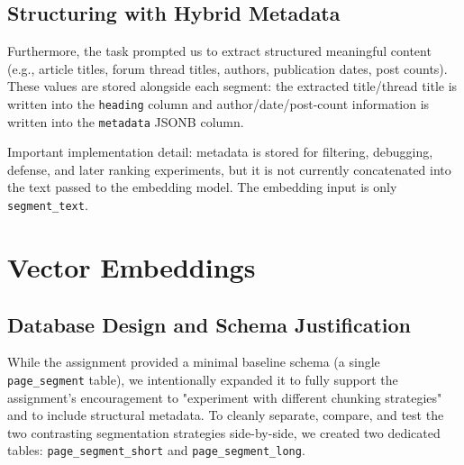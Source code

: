 \documentclass[9pt]{IEEEtran}
\begin{document}
\subsection{Structuring with Hybrid Metadata}
Furthermore, the task prompted us to extract structured meaningful content (e.g., article titles, forum thread titles, authors, publication dates, post counts).
These values are stored alongside each segment: the extracted title/thread title is written into the \texttt{heading} column and author/date/post-count information is written into the \texttt{metadata} JSONB column.

Important implementation detail: metadata is stored for filtering, debugging, defense, and later ranking experiments, but it is not currently concatenated into the text passed to the embedding model.
The embedding input is only \texttt{segment\_text}.

\section{Vector Embeddings}
\subsection{Database Design and Schema Justification}
While the assignment provided a minimal baseline schema (a single \texttt{page\_segment} table), we intentionally expanded it to fully support the assignment's encouragement to "experiment with different chunking strategies"
and to include structural metadata. To cleanly separate, compare, and test the two contrasting segmentation strategies side-by-side, we created two dedicated tables: \texttt{page\_segment\_short} and \texttt{page\_segment\_long}.
\end{document}
